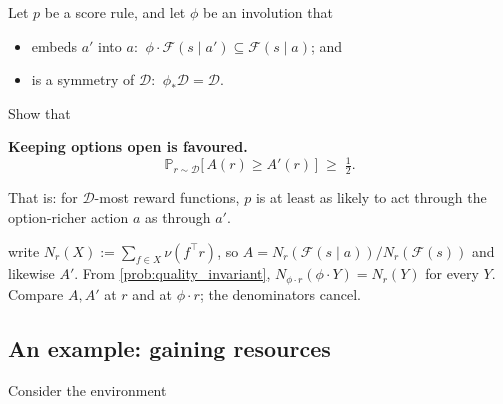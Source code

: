 \documentclass[11pt]{article}
\newcommand{\Prob}{\mathbb{P}}
\newcommand{\Dist}{\mathcal{D}}    %
\newcommand{\F}{\mathcal{F}}       %
\begin{document}
\begin{exercise}
\label{prob:power_seeking} Let $p$ be a score rule, and let $\phi$ be an
involution that
\begin{itemize}\itemsep=2pt
  \item[1.] embeds $a'$ into $a$: $\ \phi\cdot\F(s\mid a') \subseteq \F(s\mid a)$; and
  \item[2.] is a symmetry of $\Dist$: $\ \phi_*\Dist = \Dist$.
\end{itemize}
Show that

\begin{callout}
\textbf{Keeping options open is favoured.}
$$
\Prob_{r\sim\Dist}\bigl[\, A(r) \ge A'(r) \,\bigr] \;\ge\; \tfrac{1}{2}.
$$
\end{callout}

\noindent That is: for $\Dist$-most reward functions, $p$ is at least as likely to act through the
option-richer action $a$ as through $a'$.
\end{exercise}
\begin{hint}
write $N_r(X) := \sum_{f\in X}\nu(f^\top r)$, so $A = N_r(\F(s\mid a))/N_r(\F(s))$ and
likewise $A'$. From \cref{prob:quality_invariant}, $N_{\phi\cdot r}(\phi\cdot Y) = N_r(Y)$ for every
$Y$. Compare $A, A'$ at $r$ and at $\phi\cdot r$; the denominators cancel.
\end{hint}


\subsection*{An example: gaining resources}

Consider the environment

\begin{center}
\end{center}
\end{document}
